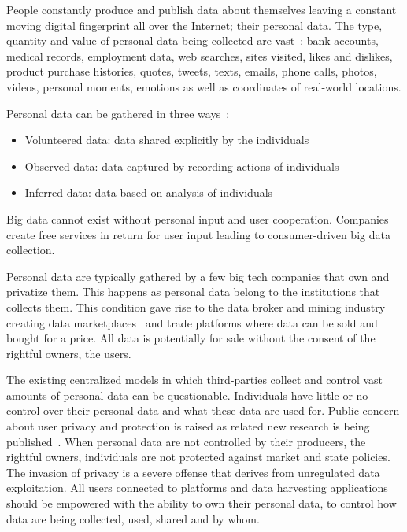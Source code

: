 People constantly produce and publish data about themselves
leaving a constant moving digital fingerprint all over the Internet; their personal data. The type, quantity and value of personal data being collected are vast~\cite{emergence_new_assets_wef}: bank accounts, medical records, employment data, web searches, sites visited,
likes and dislikes, product purchase histories, quotes, tweets, texts, emails, phone calls, photos, videos, personal moments, emotions as well as coordinates of real-world locations.

Personal data can be gathered in three ways~\cite{emergence_new_assets_wef}:

\begin{itemize}
  \item Volunteered data: data shared explicitly by the individuals
  \item Observed data: data captured by recording actions of individuals
  \item Inferred data: data based on analysis of individuals
\end{itemize}

Big data cannot exist without personal input and user cooperation. Companies create free services in return for user input leading to consumer-driven big data collection.

Personal data are typically gathered by a few big tech companies that own and privatize them. This happens as personal data belong to the institutions that collects them.  This condition gave rise to the data broker and mining industry creating data marketplaces~\cite{dawex, q_dx, datastreamx} and trade platforms where data can be sold and bought for a price. All data is potentially for sale without the consent of the rightful owners, the users.

The existing centralized models in which third-parties collect and control vast amounts of personal data can be questionable. Individuals have little or no control over their personal data and what these data are used for. Public concern about user privacy and protection is raised as related new research is being published~\cite{10.1109/SPW.2015.27}. When personal data are not controlled by their producers, the rightful owners, individuals are not protected against market and state policies. The invasion of privacy is a severe offense that derives from unregulated data exploitation. All users connected to platforms and data harvesting applications should be empowered with the ability to own their personal data, to control how data are being collected, used, shared and by whom.

